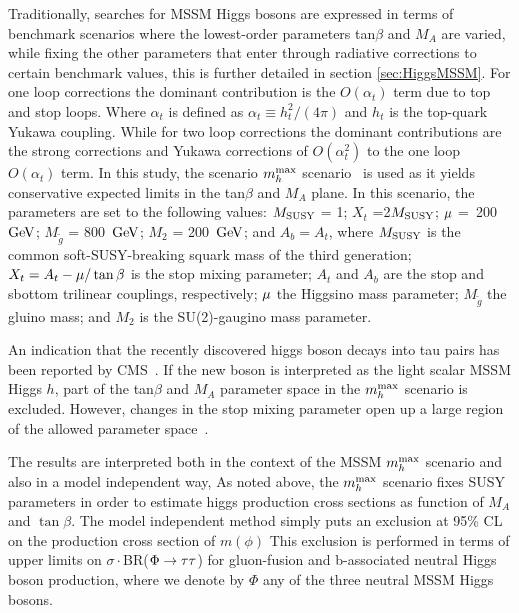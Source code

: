 Traditionally, searches for MSSM Higgs bosons are expressed in terms of benchmark scenarios where 
the lowest-order parameters tan$\beta$ and $M_A$ are varied, while fixing the other parameters that 
enter through radiative corrections to certain benchmark values, this is further detailed in section \ref{sec:HiggsMSSM}. 
For one loop corrections the dominant contribution is the $O(\alpha_{t})$ term due to top and stop loops. 
Where $\alpha_{t}$ is defined as $\alpha_{t}\equiv h_{t}^{2}/(4\pi)$ and $h_{t}$ is
the top-quark Yukawa coupling. While for two loop corrections the dominant contributions are 
the strong corrections and Yukawa corrections of $O(\alpha_{t}^{2})$ to the one loop $O(\alpha_{t})$
term\cite{MHMAX-Carena}.
In this study, the scenario $m_{h}^{\rm max}$ scenario~\cite{MHMAX-Carena,MHMAX-Carena-2002} is used as it 
yields conservative expected limits in the tan$\beta$ and $M_A$ plane. 
In this scenario, the parameters are set to the following values: 
$M_{\rm SUSY}$ = 1\TeV; $X_t$ =2$M_{\rm SUSY}$; $\mathrm{\mu}$ =~200~$\mathrm{GeV}$; $M_{\tilde{g}}$ = 800~$\mathrm{GeV}$; 
$M_2$ = 200~$\mathrm{GeV}$; and $A_b = A_t$, where $M_{\rm SUSY}$ is the common soft-SUSY-breaking squark 
mass of the third generation; $X_t = A_t - \mathrm{\mu}/\tan\beta$ is the stop mixing parameter; $A_t$ 
and $A_b$ are the stop and sbottom trilinear couplings, respectively; $\mathrm{\mu}$ the Higgsino mass 
parameter; $M_{\tilde{g}}$ the gluino mass; and $M_2$ is the SU(2)-gaugino mass parameter. 

An indication that the recently discovered higgs boson decays into tau pairs has been reported by 
CMS~\cite{CMS-PAPER-HIG-13-004}.
If the new boson is interpreted as the light scalar MSSM Higgs $h$, part of the tan$\beta$ 
and $M_A$ parameter space in the $m_{h}^{\rm max}$ scenario is excluded. 
However, changes in the stop mixing parameter open up a large region of the allowed parameter 
space~\cite{Heinemeyer:2011aa,Carena:2013qia}. 

The results are interpreted both in the context of the MSSM 
$m_{h}^{\rm max}$ scenario and also in a model independent way,
As noted above, the $m_{h}^{\rm max}$ scenario fixes SUSY parameters
in order to estimate higgs production cross sections as function of
$M_{A}$ and $\tan\beta$. The model independent method simply 
puts an exclusion at 95\% CL on the production cross section of $m(\phi)$
This exclusion is performed in terms of upper limits on $\sigma\cdot$BR($\Phi\to\mathrm{\tau}\mathrm{\tau}$) 
for gluon-fusion and b-associated neutral Higgs boson production,
where we denote by $\Phi$ any of the three neutral MSSM Higgs bosons.




